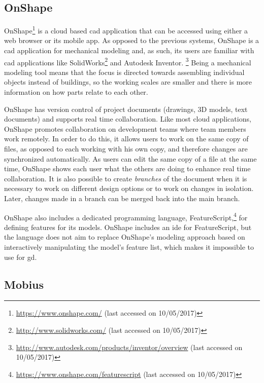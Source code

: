 \subsection{OnShape}
OnShape\footnote{\url{https://www.onshape.com/} (last accessed on 10/05/2017)} is a cloud based \gls{cad} application that can be accessed using either a web browser or its mobile app.
As opposed to the previous systems, OnShape is a \gls{cad} application for mechanical modeling and, as such, its users are familiar with \gls{cad} applications like SolidWorks\footnote{\url{http://www.solidworks.com/} (last accessed on 10/05/2017)} and Autodesk Inventor.%
\footnote{\url{http://www.autodesk.com/products/inventor/overview} (last accessed on 10/05/2017)}
Being a mechanical modeling tool means that the focus is directed towards assembling individual objects instead of buildings, so the working scales are smaller and there is more information on how parts relate to each other.

OnShape has version control of project documents (drawings, 3D models, text documents) and supports real time collaboration.
Like most cloud applications, OnShape promotes collaboration on development teams where team members work remotely.
In order to do this, it allows users to work on the same copy of files, as opposed to each working with his own copy, and therefore changes are synchronized automatically.
As users can edit the same copy of a file at the same time, OnShape shows each user what the others are doing to enhance real time collaboration.
It is also possible to create {\it branches} of the document when it is necessary to work on different design options or to work on changes in isolation.
Later, changes made in a branch can be merged back into the main branch.

OnShape also includes a dedicated programming language, FeatureScript,\footnote{\url{https://www.onshape.com/featurescript} (last accessed on 10/05/2017)} for defining features for its models.
OnShape includes an \gls{ide} for FeatureScript, but the language does not aim to replace OnShape's modeling approach based on interactively manipulating the model's feature list, which makes it impossible to use for \gls{gd}.


\subsection{Mobius}

